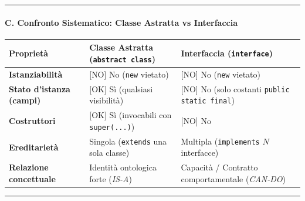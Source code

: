 \documentclass[11pt,a4paper]{article}
\newcommand{\passthrough}[1]{#1}
\begin{document}
\begin{center}\rule{0.5\linewidth}{0.5pt}\end{center}

\paragraph{C. Confronto Sistematico: Classe Astratta vs
Interfaccia}\label{c.-confronto-sistematico-classe-astratta-vs-interfaccia}

\begin{longtable}[]{@{}
  >{\raggedright\arraybackslash}p{}
  >{\raggedright\arraybackslash}p{}
  >{\raggedright\arraybackslash}p{}@{}}
\toprule\noalign{}
\begin{minipage}[b]{\linewidth}\raggedright
Proprietà
\end{minipage} & \begin{minipage}[b]{\linewidth}\raggedright
Classe Astratta (\passthrough{\lstinline!abstract class!})
\end{minipage} & \begin{minipage}[b]{\linewidth}\raggedright
Interfaccia (\passthrough{\lstinline!interface!})
\end{minipage} \\
\midrule\noalign{}
\endhead
\bottomrule\noalign{}
\endlastfoot
\textbf{Istanziabilità} & {[}NO{]} No (\passthrough{\lstinline!new!}
vietato) & {[}NO{]} No (\passthrough{\lstinline!new!} vietato) \\
\textbf{Stato d'istanza (campi)} & {[}OK{]} Sì (qualsiasi visibilità) &
{[}NO{]} No (solo costanti
\passthrough{\lstinline!public static final!}) \\
\textbf{Costruttori} & {[}OK{]} Sì (invocabili con
\passthrough{\lstinline!super(...)!}) & {[}NO{]} No \\
\textbf{Ereditarietà} & Singola (\passthrough{\lstinline!extends!} una
sola classe) & Multipla (\passthrough{\lstinline!implements!} \(N\)
interfacce) \\
\textbf{Relazione concettuale} & Identità ontologica forte (\emph{IS-A})
& Capacità / Contratto comportamentale (\emph{CAN-DO}) \\
\end{longtable}

\begin{center}\rule{0.5\linewidth}{0.5pt}\end{center}
\end{document}
